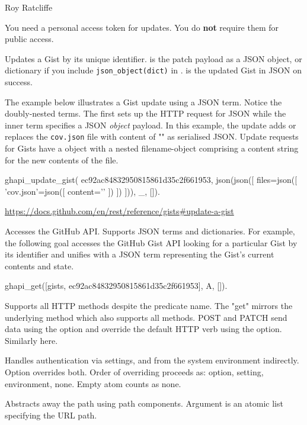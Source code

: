 \begin{tags}
Roy Ratcliffe
\end{tags}

You need a personal access token for updates. You do \textbf{not} require
them for public access.\vspace{0.7cm}

\begin{description}
Updates a Gist by its unique identifier.  is the patch payload
as a JSON object, or dictionary if you include \verb$json_object(dict)$ in
.  is the updated Gist in JSON on success.

The example below illustrates a Gist update using a JSON term.
Notice the doubly-nested  terms. The first sets up the HTTP
request for JSON while the inner term specifies a JSON \textit{object}
payload. In this example, the update adds or replaces the \verb$cov.json$
file with content of "\Scurl{}" as serialised JSON. Update requests for
Gists have a  object with a nested filename-object comprising
a content string for the new contents of the file.

\begin{code}
ghapi_update_gist(
    ec92ac84832950815861d35c2f661953,
    json(json([ files=json([ 'cov.json'=json([ content='{}'
                                             ])
                           ])
              ])), _, []).
\end{code}

\begin{tags}
\url{https://docs.github.com/en/rest/reference/gists\#update-a-gist}
\end{tags}

Accesses the GitHub API. Supports JSON terms and dictionaries. For
example, the following goal accesses the GitHub Gist API looking for
a particular Gist by its identifier and unifies  with a JSON term
representing the Gist's current contents and state.

\begin{code}
ghapi_get([gists, ec92ac84832950815861d35c2f661953], A, []).
\end{code}

Supports all HTTP methods despite the predicate name. The "get"
mirrors the underlying  method which also supports all
methods. POST and PATCH send data using the  option and
override the default HTTP verb using the  option.
Similarly here.

Handles authentication via settings, and from the system environment
indirectly. Option  overrides both. Order of
overriding proceeds as: option, setting, environment, none. Empty
atom counts as none.

Abstracts away the path using path components. Argument
 is an atomic list specifying the URL path.
\end{description}

